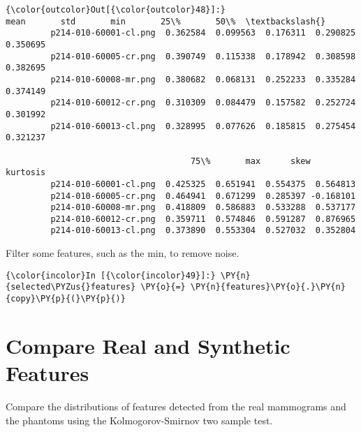             \begin{Verbatim}[commandchars=\\\{\}]
{\color{outcolor}Out[{\color{outcolor}48}]:}                            mean       std       min       25\%       50\%  \textbackslash{}
         p214-010-60001-cl.png  0.362584  0.099563  0.176311  0.290825  0.350695
         p214-010-60005-cr.png  0.390749  0.115338  0.178942  0.308598  0.382695
         p214-010-60008-mr.png  0.380682  0.068131  0.252233  0.335284  0.374149
         p214-010-60012-cr.png  0.310309  0.084479  0.157582  0.252724  0.301992
         p214-010-60013-cl.png  0.328995  0.077626  0.185815  0.275454  0.321237

                                     75\%       max      skew  kurtosis
         p214-010-60001-cl.png  0.425325  0.651941  0.554375  0.564813
         p214-010-60005-cr.png  0.464941  0.671299  0.285397 -0.168101
         p214-010-60008-mr.png  0.418809  0.586883  0.533288  0.537177
         p214-010-60012-cr.png  0.359711  0.574846  0.591287  0.876965
         p214-010-60013-cl.png  0.373890  0.553304  0.527032  0.352804
\end{Verbatim}

    Filter some features, such as the min, to remove noise.

    \begin{Verbatim}[commandchars=\\\{\}]
{\color{incolor}In [{\color{incolor}49}]:} \PY{n}{selected\PYZus{}features} \PY{o}{=} \PY{n}{features}\PY{o}{.}\PY{n}{copy}\PY{p}{(}\PY{p}{)}
\end{Verbatim}

    \section{Compare Real and Synthetic
Features}\label{compare-real-and-synthetic-features}

    Compare the distributions of features detected from the real mammograms
and the phantoms using the Kolmogorov-Smirnov two sample test.

